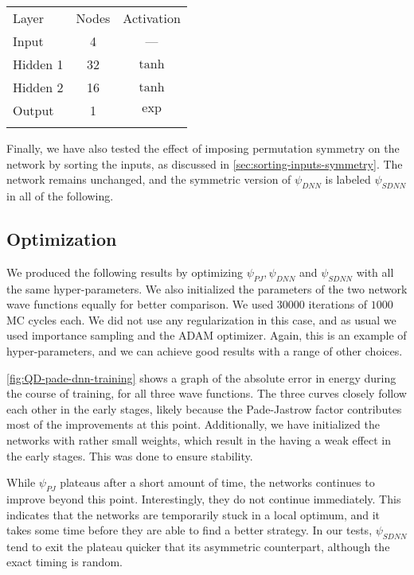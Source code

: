 \documentclass[Thesis.tex]{subfiles}
\begin{document}
\begin{center}
  \begin{tabular}{lcc}
    \toprule
    \addlinespace
    Layer & Nodes & Activation\\
    \addlinespace
    \midrule
    \addlinespace
    \addlinespace
    Input & 4 & ---\\
    Hidden 1& 32 & $\tanh$\\
    Hidden 2& 16 & $\tanh$\\
    Output & 1 & $\exp$\\
    \addlinespace
    \addlinespace
    \bottomrule
  \end{tabular}
\end{center}

Finally, we have also tested the effect of imposing permutation symmetry on the
network by sorting the inputs, as discussed in
\cref{sec:sorting-inputs-symmetry}. The network remains unchanged, and the
symmetric version of $\psi_{DNN}$ is labeled $\psi_{SDNN}$ in all of the following.


\subsection{Optimization}

We produced the following results by optimizing $\psi_{PJ}, \psi_{DNN}$ and
$\psi_{SDNN}$ with all the same hyper-parameters. We also initialized the
parameters of the two network wave functions equally for better comparison.
We used $\num{30000}$ iterations of $1000$ MC cycles each. We did not use any
regularization in this case, and as usual we used importance sampling and the
ADAM optimizer. Again, this is an example of hyper-parameters, and we can
achieve good results with a range of other choices.

\cref{fig:QD-pade-dnn-training} shows a graph of the absolute error in energy
during the course of training, for all three wave functions. The three curves
closely follow each other in the early stages, likely because the Pade-Jastrow
factor contributes most of the improvements at this point. Additionally, we have
initialized the networks with rather small weights, which result in the having a
weak effect in the early stages. This was done to ensure stability.

While $\psi_{PJ}$ plateaus after a short amount of time, the
networks continues to improve beyond this point. Interestingly, they do not
continue immediately. This indicates that the networks are temporarily stuck in
a local optimum, and it takes some time before they are able to find a better
strategy. In our tests, $\psi_{SDNN}$ tend to exit the plateau quicker that its
asymmetric counterpart, although the exact timing is random.
\end{document}
